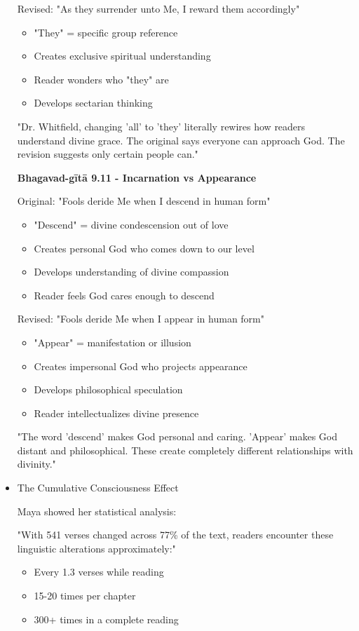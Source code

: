 \documentclass[11pt,twoside]{book}
\begin{document}
\begin{itemize}
Revised: "As they surrender unto Me, I reward them accordingly"
\begin{itemize}
\item "They" = specific group reference
\item Creates exclusive spiritual understanding
\item Reader wonders who "they" are
\item Develops sectarian thinking
\end{itemize}

"Dr. Whitfield, changing 'all' to 'they' literally rewires how readers understand divine grace. The original says everyone can approach God. The revision suggests only certain people can."

\textbf{\textbf{Bhagavad-gītā 9.11 - Incarnation vs Appearance}}

Original: "Fools deride Me when I descend in human form"
\begin{itemize}
\item "Descend" = divine condescension out of love
\item Creates personal God who comes down to our level
\item Develops understanding of divine compassion
\item Reader feels God cares enough to descend
\end{itemize}

Revised: "Fools deride Me when I appear in human form"
\begin{itemize}
\item "Appear" = manifestation or illusion
\item Creates impersonal God who projects appearance
\item Develops philosophical speculation
\item Reader intellectualizes divine presence
\end{itemize}

"The word 'descend' makes God personal and caring. 'Appear' makes God distant and philosophical. These create completely different relationships with divinity."
\item The Cumulative Consciousness Effect
\label{sec:orgbeb3bb9}

Maya showed her statistical analysis:

"With 541 verses changed across 77\% of the text, readers encounter these linguistic alterations approximately:"
\begin{itemize}
\item Every 1.3 verses while reading
\item 15-20 times per chapter
\item 300+ times in a complete reading
\end{itemize}


\end{itemize}
\end{document}
